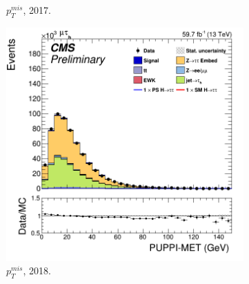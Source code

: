 \begin{figure}
\begin{subfigure}[b]{0.33\linewidth}
    \caption{$p^{mis}_T$, 2017.} 
    \vspace{0.5ex}
  \end{subfigure} 
    \begin{subfigure}[b]{0.33\linewidth}
    \centering
    \includegraphics[width=\linewidth]{Chapitre7/Images/CtrlPlots/2018/PUPPImet.png} 
    \caption{$p^{mis}_T$, 2018.} 
    \vspace{0.5ex}
  \end{subfigure} 
  \caption{}
  \label{page3}
\end{figure}

